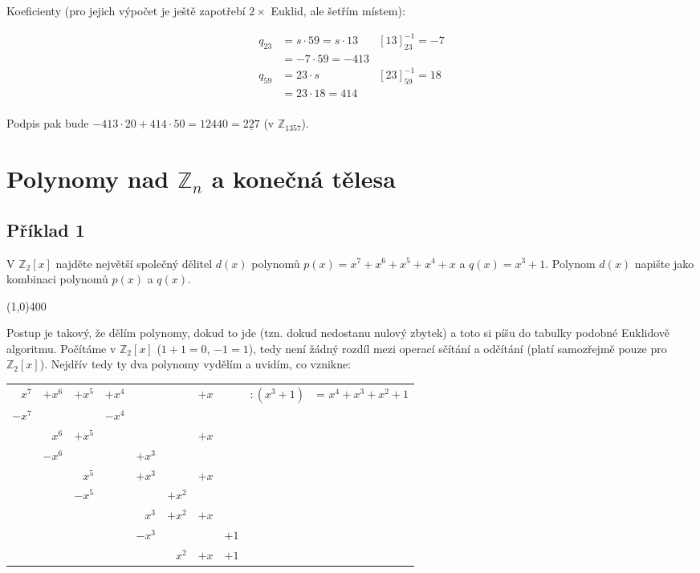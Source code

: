 \documentclass{article}
\begin{document}
Koeficienty (pro jejich výpočet je ještě zapotřebí $2\times$ Euklid, ale šetřím místem):

\begin{align*}
q_{23} & = s\cdot 59 = s\cdot 13 & \left[ 13\right]^{-1}_{23} = -7\\
		& = -7 \cdot 59 = -413 \\
q_{59} & = 23 \cdot s & \left[ 23\right]^{-1}_{59} = 18\\
		& = 23 \cdot 18 = 414 \\
\end{align*}

Podpis pak bude $-413\cdot20 + 414\cdot50 = 12440 = \underline{227}$ (v $\mathbb{Z}_{1357}$).

\clearpage

\section{Polynomy nad $\mathbb{Z}_n$ a konečná tělesa }

\subsection{Příklad 1}
V $\mathbb{Z}_2[x]$ najděte největší společný dělitel $d(x)$ polynomů $p(x) = x^7 + x^6 + x^5 + x^4 + x$ a $q(x) = x^3 + 1$. Polynom $d(x)$ napište jako kombinaci polynomů $p(x)$ a $q(x)$. 

\line(1,0){400}

Postup je takový, že dělím polynomy, dokud to jde (tzn. dokud nedostanu nulový zbytek) a toto si píšu do tabulky podobné Euklidově algoritmu. Počítáme v \(\mathbb{Z}_2[x]\) (\(1+1=0\), \(-1=1\)), tedy není žádný rozdíl mezi operací sčítání a odčítání (platí samozřejmě pouze pro \(\mathbb{Z}_2[x]\)). Nejdřív tedy ty dva polynomy vydělím a uvidím, co vznikne:

\begin{tabular}{rrrrrrrr|ll}
		$x^7$ 	& $+x^6$ 	& $+ x^5$ & $+x^4$ 	&   				&  				& $+ x$  	&  		& $: (x^3 + 1)$ 	& = $x^4 + x^3 + x^2 + 1$ \\ 
		$-x^7$ 	& 				&  				&  $-x^4$ &   				&  				& 	 			&  		& 								&  \\ 
		\cline{1-4}
		 				&  $x^6$	& $+ x^5$	&         &   				&  				& $+ x$		&  		& 								&  \\ 
		 				&  $-x^6$	& 				&         & $+ x^3$  	&  				& 				&  		& 								&  \\ 
		\cline{2-5}
		 				&    			& $x^5$		&         & $+ x^3$		& 				& $+ x$		&  		& 								&  \\ 
		 				&    			& $-x^5$	&        	& 					&$+ x^2$	& 				&  		& 								&  \\ 
		\cline{3-6}
		 				&    			& 				&        	& $x^3$			&$+ x^2$	& $+ x$		&  		& 								&  \\
		 				&    			& 				&        	& $-x^3$		&					& 			  &$+1$	& 								&  \\  
		\cline{5-8}
						&    			& 				&        	& 					&	$x^2$		& $+ x$	  &$+1$	& 								&  \\  
		
\end{tabular}
\end{document}
